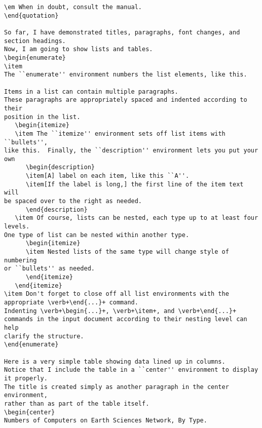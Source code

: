\begin{verbatim}
\em When in doubt, consult the manual.
\end{quotation}

So far, I have demonstrated titles, paragraphs, font changes, and
section headings.
Now, I am going to show lists and tables.
\begin{enumerate}
\item 
The ``enumerate'' environment numbers the list elements, like this.

Items in a list can contain multiple paragraphs.
These paragraphs are appropriately spaced and indented according to their
position in the list.
   \begin{itemize}
   \item The ``itemize'' environment sets off list items with ``bullets'',
like this.  Finally, the ``description'' environment lets you put your own
      \begin{description}
      \item[A] label on each item, like this ``A''.
      \item[If the label is long,] the first line of the item text will
be spaced over to the right as needed.
      \end{description}
   \item Of course, lists can be nested, each type up to at least four levels.
One type of list can be nested within another type.
      \begin{itemize}
      \item Nested lists of the same type will change style of numbering 
or ``bullets'' as needed.
      \end{itemize}
   \end{itemize}
\item Don't forget to close off all list environments with the 
appropriate \verb+\end{...}+ command.
Indenting \verb+\begin{...}+, \verb+\item+, and \verb+\end{...}+
commands in the input document according to their nesting level can help 
clarify the structure.
\end{enumerate}

Here is a very simple table showing data lined up in columns.
Notice that I include the table in a ``center'' environment to display
it properly.
The title is created simply as another paragraph in the center environment,
rather than as part of the table itself.
\begin{center}
Numbers of Computers on Earth Sciences Network, By Type.


\end{verbatim}
